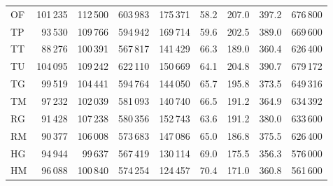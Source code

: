 \begin{minipage}{\textwidth}
\begin{tabular*}{\textwidth}{@{\extracolsep{\fill}}lrrrrrrrr@{}}
OF & 101\,235 & 112\,500 & 603\,983 & 175\,371 & 58.2 & 207.0 & 397.2 & 676\,800\\
TP & 93\,530 & 109\,766 & 594\,942 & 169\,714 & 59.6 & 202.5 & 389.0 & 669\,600\\
TT & 88\,276 & 100\,391 & 567\,817 & 141\,429 & 66.3 & 189.0 & 360.4 & 626\,400\\
TU & 104\,095 & 109\,242 & 622\,110 & 150\,669 & 64.1 & 204.8 & 390.7 & 679\,172\\
TG & 99\,519 & 104\,441 & 594\,764 & 144\,050 & 65.7 & 195.8 & 373.5 & 649\,316\\
TM & 97\,232 & 102\,039 & 581\,093 & 140\,740 & 66.5 & 191.2 & 364.9 & 634\,392\\
RG & 91\,428 & 107\,238 & 580\,356 & 152\,743 & 63.6 & 191.2 & 380.0 & 633\,600\\
RM & 90\,377 & 106\,008 & 573\,683 & 147\,086 & 65.0 & 186.8 & 375.5 & 626\,400\\
HG & 94\,944 & 99\,637 & 567\,419 & 130\,114 & 69.0 & 175.5 & 356.3 & 576\,000\\
HM & 96\,088 & 100\,840 & 574\,254 & 124\,457 & 70.4 & 171.0 & 360.8 & 561\,600\\
\bottomrule\end{tabular*}
\end{minipage}\par\medskip
